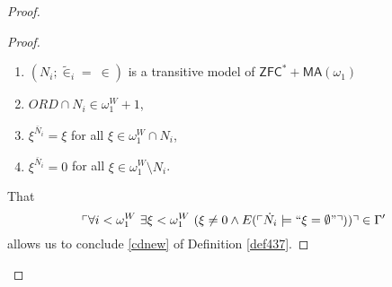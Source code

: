 \documentclass[12pt]{article}
\numberwithin{equation}{section}
\begin{document}
\begin{proof}
\begin{proof}
\begin{enumerate}[label=(\alph*)]
    \item $(N_i; \tilde{\in}_i = \ \in)$ is a transitive model of $\mathsf{ZFC}^* + \mathsf{MA}(\omega_1)$ 
    \item $ORD \cap N_i \in \omega_1^W + 1$,
    \item $\xi^{\bar{N}_i} = \xi$ for all $\xi \in \omega_1^W \cap N_i$,
    \item $\xi^{\bar{N}_i} = 0$ for all $\xi \in \omega_1^W \setminus N_i$.
\end{enumerate}
That 
\begin{equation*}
\ulcorner \forall i < \omega_1^W \ \exists \xi < \omega_1^W \ (\xi \neq 0 \wedge E(\ulcorner \dot{N}_i \models ``\xi = \emptyset" \urcorner)) \urcorner \in \Gamma'
\end{equation*}
allows us to conclude \ref{cdnew} of Definition \ref{def437}.


\end{proof}
\end{proof}
\end{document}
